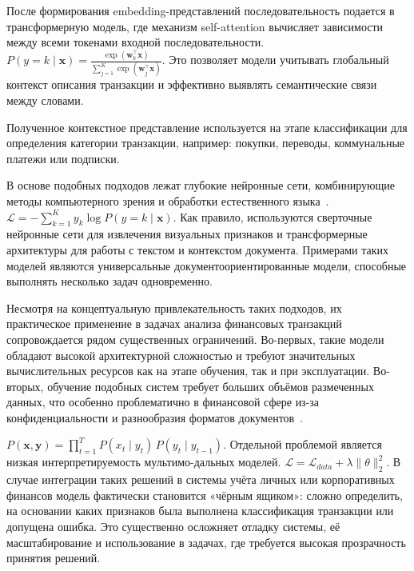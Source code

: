 \documentclass[14pt,a4paper]{extarticle}
\newenvironment{my_example}
{\par\indent\noindent{Пример.} \upshape}
{\par}
\begin{document}
\begin{my_example}
После формирования embedding-представлений последовательность подается в трансформерную модель, 
где механизм self-attention вычисляет зависимости между всеми токенами входной последовательности. $P(y=k \mid \mathbf{x}) =
\frac{\exp(\mathbf{w}_k^\top \mathbf{x})}
{\sum_{j=1}^{K} \exp(\mathbf{w}_j^\top \mathbf{x})}$. Это позволяет модели учитывать глобальный контекст описания транзакции и эффективно выявлять семантические связи между словами.

Полученное контекстное представление используется на этапе классификации для определения категории транзакции, 
например: покупки, переводы, коммунальные платежи или подписки.

\end{my_example}

В основе подобных подходов лежат глубокие нейронные сети, комбинирующие методы компьютерного зрения и обработки естественного языка~\cite{jin2025}. $\mathcal{L} =
- \sum_{k=1}^{K} y_k \log P(y=k \mid \mathbf{x})$. Как правило, используются сверточные нейронные сети для извлечения визуальных признаков и трансформерные архитектуры для работы с текстом и контекстом документа. Примерами таких моделей являются универсальные документоориентированные модели, способные выполнять несколько задач одновременно.

Несмотря на концептуальную привлекательность таких подходов, их практическое применение в задачах анализа финансовых транзакций сопровождается рядом существенных ограничений. Во-первых, такие модели обладают высокой архитектурной сложностью и требуют значительных вычислительных ресурсов как на этапе обучения, так и при эксплуатации. Во-вторых, обучение подобных систем требует больших объёмов размеченных данных, что особенно проблематично в финансовой сфере из-за конфиденциальности и разнообразия форматов документов~\cite{masri2024}. 

$P(\mathbf{x}, \mathbf{y}) = \prod_{t=1}^{T} P(x_t \mid y_t)\, P(y_t \mid y_{t-1})$. Отдельной проблемой является низкая интерпретируемость мультимо-дальных моделей. $\mathcal{L} =
\mathcal{L}_{data} + \lambda \|\theta\|_2^2$. В случае интеграции таких решений в системы учёта личных или корпоративных финансов модель фактически становится «чёрным ящиком»: сложно определить, на основании каких признаков была выполнена классификация транзакции или допущена ошибка. Это существенно осложняет отладку системы, её масштабирование и использование в задачах, где требуется высокая прозрачность принятия решений.
\end{document}
